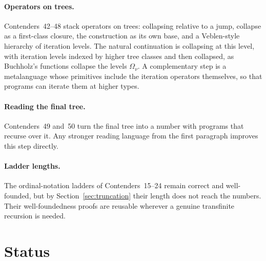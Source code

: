 \documentclass[11pt]{article}
\theoremstyle{definition}
\theoremstyle{remark}
\begin{document}
\paragraph{Operators on trees.} Contenders~42--48 stack operators on trees:
collapsing relative to a jump, collapse as a first-class closure, the
construction as its own base, and a Veblen-style hierarchy of iteration
levels. The natural continuation is collapsing at this level, with iteration
levels indexed by higher tree classes and then collapsed, as Buchholz's
functions collapse the levels $\Omega_\nu$. A complementary step is a
metalanguage whose primitives include the iteration operators themselves, so
that programs can iterate them at higher types.

\paragraph{Reading the final tree.} Contenders~49 and~50 turn the final tree
into a number with programs that recurse over it. Any stronger reading
language from the first paragraph improves this step directly.

\paragraph{Ladder lengths.} The ordinal-notation ladders of Contenders~15--24
remain correct and well-founded, but by Section~\ref{sec:truncation} their
length does not reach the numbers. Their well-foundedness proofs are reusable
wherever a genuine transfinite recursion is needed.

\section{Status}
\end{document}
